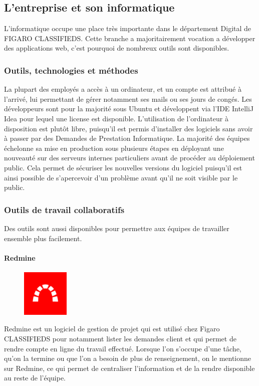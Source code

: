 
\subsection{L'entreprise et son informatique}
L'informatique occupe une place très importante dans le département Digital de FIGARO CLASSIFIEDS.
Cette branche a majoritairement vocation a développer des applications web, c'est pourquoi de nombreux outils sont disponibles.

\subsubsection{Outils, technologies et méthodes}
\label{subs:Outils, technologies et methodes}
La plupart des employés a accès à un ordinateur, et un compte est attribué à l'arrivé, lui permettant de gérer notamment ses mails ou ses jours de congés.
Les développeurs sont pour la majorité sous Ubuntu et développent via l'IDE IntelliJ Idea pour lequel une license est disponible.
L'utilisation de l'ordinateur à disposition est plutôt libre, puisqu'il est permis d'installer des logiciels sans avoir à passer par des Demandes de Prestation Informatique.
La majorité des équipes échelonne sa mise en production sous plusieurs étapes en déployant une nouveauté sur des serveurs internes particuliers avant de procéder au déploiement public.
Cela permet de sécuriser les nouvelles versions du logiciel puisqu'il est ainsi possible de s'apercevoir d'un problème avant qu'il ne soit visible par le public.

\subsubsection{Outils de travail collaboratifs}
\label{subs:Outils de travail collaboratifs}
Des outils sont aussi disponibles pour permettre aux équipes de travailler ensemble plus facilement.
\paragraph{Redmine}
\label{par:Redmine}
\begin{figure}
  \begin{center}
    \includegraphics[width=0.20\textwidth]{Pictures/redmine_logo.png}
  \end{center}
\end{figure}
Redmine est un logiciel de gestion de projet qui est utilisé chez Figaro CLASSIFIEDS pour notamment lister les demandes client et qui permet de rendre compte en ligne du travail effectué.
Lorsque l'on s'occupe d'une tâche, qu'on la termine ou que l'on a besoin de plus de renseignement, on le mentionne sur Redmine, ce qui permet de centraliser l'information et de la rendre disponible au reste de l'équipe.
